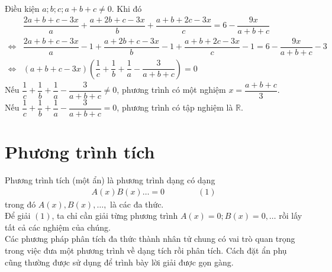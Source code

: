 \begin{bt}
{\begin{enumerate}
	Điều kiện $a;b;c;a+b+c\ne 0$. Khi đó
	\begin{align*}
		&\dfrac{2a+b+c-3x}{a}+\dfrac{a+2b+c-3x}{b}+\dfrac{a+b+2c-3x}{c} = 6-\dfrac{9x}{a+b+c}\\
		\Leftrightarrow & \dfrac{2a+b+c-3x}{a}-1+\dfrac{a+2b+c-3x}{b}-1+\dfrac{a+b+2c-3x}{c}-1 = 6-\dfrac{9x}{a+b+c}-3\\
		\Leftrightarrow & (a+b+c-3x)\left(\dfrac{1}{c}+\dfrac{1}{b}+\dfrac{1}{a} -\dfrac{3}{a+b+c} \right) =0
	\end{align*}
	Nếu $\dfrac{1}{c}+\dfrac{1}{b}+\dfrac{1}{a} -\dfrac{3}{a+b+c}\ne 0$, phương trình có một nghiệm $x=\dfrac{a+b+c}{3}.$\\
	Nếu $ \dfrac{1}{c}+\dfrac{1}{b}+\dfrac{1}{a} -\dfrac{3}{a+b+c}=0$, phương trình có tập nghiệm là $\mathbb{R}.$
\end{enumerate}


}
\end{bt}


\section{Phương trình tích}
Phương trình tích (một ẩn) là phương trình dạng có dạng
\begin{eqnarray*}
	A(x)B(x)\ldots =0			\qquad \qquad (1)
\end{eqnarray*}
trong đó $A(x), B(x),\ldots,$ là các đa thức.\\
Để giải $(1)$, ta chỉ cần giải từng phương trình $A(x)=0;B(x)=0,\ldots$ rồi lấy tất cả các nghiệm của chúng.\\
Các phương pháp phân tích đa thức thành nhân tử chung có vai trò quan trọng trong việc đưa một phương trình về dạng tích rồi phân tích. Cách đặt ẩn phụ cũng thường được sử dụng để trình bày lời giải được gọn gàng.\\

